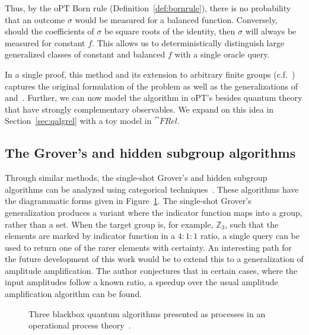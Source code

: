Thus, by the oPT Born rule (Definition~\ref{def:bornrule}), there is no probability that an outcome $\sigma$ would be measured for a balanced function.  Conversely, should the coefficients of $\sigma$ be square roots of the identity, then $\sigma$ will always be measured for constant $f$.  This allows us to deterministically distinguish large generalized classes of constant and balanced $f$ with a single oracle query.  

In a single proof, this method and its extension to arbitrary finite groups (c.f.~\cite{vicary-tqa}) captures the original formulation of the problem as well as the generalizations of~\cite{hoyer1999conjugated} and~\cite{batty2006extending}. Further, we can now model the algorithm in oPT's besides quantum theory that have strongly complementary observables. We expand on this idea in Section~\ref{sec:qalgrel} with a toy model in $\cat{FRel}$. 

\subsection{The Grover's and hidden subgroup algorithms}
Through similar methods, the single-shot Grover's and hidden subgroup algorithms can be analyzed using categorical techniques~\cite{vicary-tqa}. These algorithms have the diagrammatic forms given in Figure~\ref{fig:algtriplet}. The single-shot Grover's generalization produces a variant where the indicator function maps into a group, rather than a set. When the target group is, for example, $\mathbb{Z}_3$, such that the elements are marked by indicator function in a $4:1:1$ ratio, a single query can be used to return one of the rarer elements with certainty. An interesting path for the future development of this work would be to extend this to a generalization of amplitude amplification. The author conjectures that in certain cases, where the input amplitudes follow a known ratio, a speedup over the usual amplitude amplification algorithm can be found.

\begin{figure}[t]

\caption{Three blackbox quantum algorithms presented as processes in an operational process theory~\cite{vicary-tqa}.}
\label{fig:algtriplet}
\end{figure}


